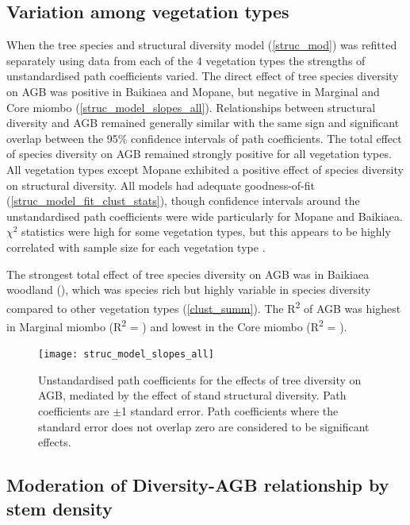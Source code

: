 \documentclass[11pt,a4paper]{article}
\begin{document}
\subsection{Variation among vegetation types}

When the tree species and structural diversity model (\autoref{struc_mod}) was refitted separately using data from each of the 4 vegetation types the strengths of unstandardised path coefficients varied.  The direct effect of tree species diversity on AGB was positive in Baikiaea and Mopane, but negative in Marginal and Core miombo (\autoref{struc_model_slopes_all}). Relationships between structural diversity and AGB remained generally similar with the same sign and significant overlap between the 95\% confidence intervals of path coefficients. The total effect of species diversity on AGB remained strongly positive for all vegetation types. All vegetation types except Mopane exhibited a positive effect of species diversity on structural diversity. All models had adequate goodness-of-fit (\autoref{struc_model_fit_clust_stats}), though confidence intervals around the unstandardised path coefficients were wide particularly for Mopane and Baikiaea. $\chi^{2}$ statistics were high for some vegetation types, but this appears to be highly correlated with sample size for each vegetation type \citep{Hooper2008}.

The strongest total effect of tree species diversity on AGB was in Baikiaea woodland (\struccsb{}), which was species rich but highly variable in species diversity compared to other vegetation types (\autoref{clust_summ}). The R\textsuperscript{2} of AGB was highest in Marginal miombo (R\textsuperscript{2} = \strucarsq{}) and lowest in the Core miombo (R\textsuperscript{2} = \strucbrsq{}).

\begin{figure}[H]
\centering
	\texttt{[image: struc\_model\_slopes\_all]}
	\caption{Unstandardised path coefficients for the effects of tree diversity on AGB, mediated by the effect of stand structural diversity. Path coefficients are $\pm$1 standard error. Path coefficients where the standard error does not overlap zero are considered to be significant effects.}
	\label{struc_model_slopes_all}
\end{figure}



\subsection{Moderation of Diversity-AGB relationship by stem density}
\end{document}
